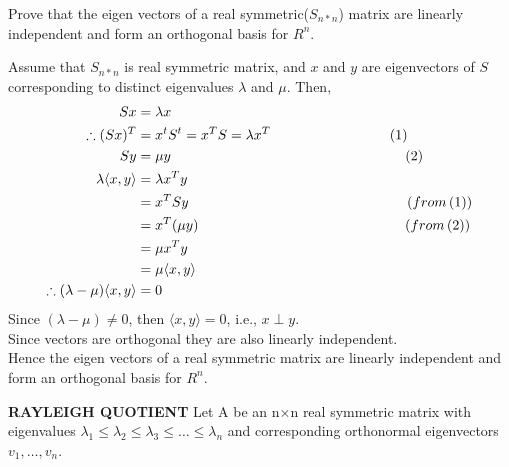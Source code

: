 \documentclass[solution,addpoints,12pt]{exam}
\newenvironment{Solution}{\begin{solution}}{\end{solution}}
\begin{document}
\begin{questions}
\question Prove that the eigen vectors of a real symmetric($ S_{n*n}$) matrix are linearly independent and form an orthogonal basis for $R^n$.
\begin{Solution}
Assume that $ S_{n*n}$ is real symmetric matrix, and $x$ and $y$ are eigenvectors of $S$ corresponding to distinct eigenvalues $\lambda$ and $\mu$. Then,\\
\begin{align*}
    Sx &= \lambda x\\
    \therefore (Sx)^T &= x^t S^t = x^TS = \lambda x^T \hspace*{30mm}(1)\\
    Sy &= \mu y \hspace*{59mm}(2)\\
    \lambda \langle x,y \rangle &= \lambda x^T y\\
    &= x^TSy \hspace*{55mm}(from\,(1))\\
    &= x^T(\mu y)\hspace*{52mm}(from\,(2))\\
    &= \mu x^Ty\\
    &= \mu \langle x,y \rangle\\
    \therefore (\lambda - \mu) \langle x,y \rangle &= 0
\end{align*}
 Since $(\lambda - \mu) \neq 0$, then $\langle x,y \rangle=0$, i.e., $x \perp y$.\\
 Since vectors are orthogonal they are also linearly independent.\\
 
 Hence the eigen vectors of a real symmetric matrix are linearly independent and form an orthogonal basis for $R^n$.
\end{Solution}

\question \textbf{RAYLEIGH QUOTIENT}
\newline Let A be an n$ \times $n real symmetric matrix with eigenvalues $\lambda_1 \leq \lambda_2 \leq \lambda_3 \leq \dots \leq  \lambda_n $ and corresponding orthonormal eigenvectors $ v_1, \dots, v_n $.

\begin{parts}

\end{parts}
\end{questions}
\end{document}

